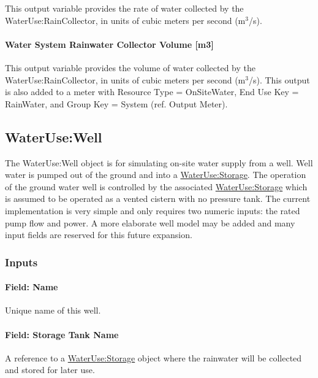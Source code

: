 This output variable provides the rate of water collected by the WaterUse:RainCollector, in units of cubic meters per second (m\(^{3}\)/s).

\paragraph{Water System Rainwater Collector Volume {[}m3{]}}\label{water-system-rainwater-collector-volume-m3}

This output variable provides the volume of water collected by the WaterUse:RainCollector, in units of cubic meters per second (m\(^{3}\)/s). This output is also added to a meter with Resource Type = OnSiteWater, End Use Key = RainWater, and Group Key = System (ref. Output Meter).

\subsection{WaterUse:Well}\label{waterusewell}

The WaterUse:Well object is for simulating on-site water supply from a well. Well water is pumped out of the ground and into a \hyperref[waterusestorage]{WaterUse:Storage}. The operation of the ground water well is controlled by the associated \hyperref[waterusestorage]{WaterUse:Storage} which is assumed to be operated as a vented cistern with no pressure tank. The current implementation is very simple and only requires two numeric inputs: the rated pump flow and power. A more elaborate well model may be added and many input fields are reserved for this future expansion.

\subsubsection{Inputs}\label{inputs-4-038}

\paragraph{Field: Name}\label{field-name-4-033}

Unique name of this well.

\paragraph{Field: Storage Tank Name}\label{field-storage-tank-name-1}

A reference to a \hyperref[waterusestorage]{WaterUse:Storage} object where the rainwater will be collected and stored for later use.

